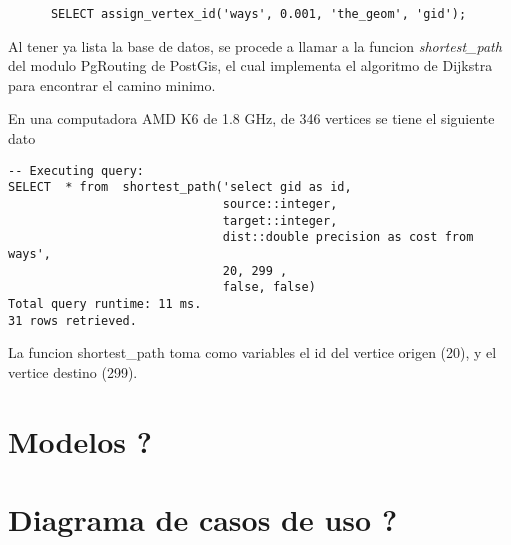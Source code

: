     \begin{center}
      \begin{verbatim}
      SELECT assign_vertex_id('ways', 0.001, 'the_geom', 'gid');
      \end{verbatim}
    \end{center}

    Al tener ya lista la base de datos, se procede a llamar a la funcion \emph{shortest\_path} del modulo PgRouting  de PostGis, el cual implementa el algoritmo de Dijkstra para encontrar el camino minimo. 

    En una computadora AMD K6 de 1.8 GHz, de 346 vertices se tiene el siguiente dato

    \begin{center}
      \begin{verbatim}
-- Executing query:
SELECT  * from  shortest_path('select gid as id, 
                              source::integer,
                              target::integer, 
                              dist::double precision as cost from ways',
                              20, 299 , 
                              false, false)
Total query runtime: 11 ms.
31 rows retrieved.
      \end{verbatim}
    \end{center}

    La funcion shortest\_path toma como variables el id del vertice origen (20), y el vertice destino (299).

  

  \section{Modelos ?} %
  \label{sec:modelos_}
  
  \section{Diagrama de casos de uso ?} %
  \label{sec:diagrama_de_casos_de_uso_}
  









